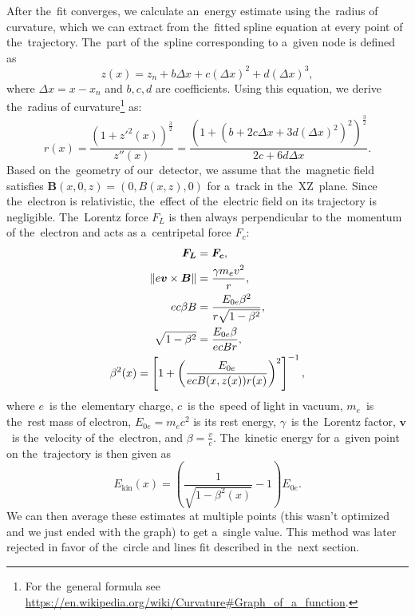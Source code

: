 		After the~fit converges, we calculate an~energy estimate using the~radius of curvature, which we can extract from the~fitted spline equation at every point of the~trajectory. The~part of the~spline corresponding to a~given node is defined as
			\begin{equation}
				z(x) = z_n + b \Delta x+c(\Delta x)^2+d(\Delta x)^3,
			\end{equation}
		where $\Delta x = x-x_n$ and $b,c,d$ are coefficients. Using this equation, we derive the~radius of curvature\footnote{For the~general formula see \url{https://en.wikipedia.org/wiki/Curvature\#Graph_of_a_function}.} as:
			\begin{equation}
				r(x) = \frac{\left(1+z'^2(x)\right)^\frac{3}{2}}{z''(x)} = \frac{\left(1+\left(b+2c\Delta x+3d(\Delta x)^2\right)^2\right)^\frac{3}{2}}{2c+6d\Delta x}.
			\end{equation}
		Based on the~geometry of our~detector, we assume that the~magnetic field satisfies $\bm{B}(x,0,z) = (0,B(x,z),0)$ for a~track in the~XZ~plane. Since the~electron is relativistic, the~effect of the~electric field on its trajectory is negligible. The~Lorentz force $F_L$ is then always perpendicular to the~momentum of the~electron and acts as a~centripetal force $F_c$:
			\begin{gather}
				\begin{aligned}
					\bm{F_L} &= \bm{F_c},\\
					\norm{e\bm{v}\times\bm{B}} &= \frac{\gamma m_e v^2}{r},\\
					e c\beta B &= \frac{E_{0e} \beta^2}{r\sqrt{1-\beta^2}},\\
					\sqrt{1-\beta^2} &= \frac{E_{0e} \beta}{ecBr},
				\end{aligned}\\
				\beta^2(x) = \left[1+\left(\frac{E_{0e}}{ecB(x,z(x))r(x)}\right)^2\right]^{-1}, \label{eq:ekin1}
			\end{gather}
		where $e$~is the~elementary charge, $c$~is the~speed of light in vacuum, $m_e$~is the~rest mass of electron, $E_{0e} = m_e c^2$ is its rest energy, $\gamma$~is the~Lorentz factor, $\bm{v}$~is the~velocity of the~electron, and $\beta = \frac{v}{c}$. The~kinetic energy for a~given point on the~trajectory is then given as
			\begin{equation}
				\label{eq:ekin2}
				E_\text{kin}(x) = \left(\frac{1}{\sqrt{1-\beta^2(x)}}-1\right)E_{0e}.
			\end{equation}
		We can then average these estimates at multiple points (this wasn't optimized and we just ended with the graph) to get a~single value. This method was later rejected in favor of the~circle and lines fit described in the~next section.
		

